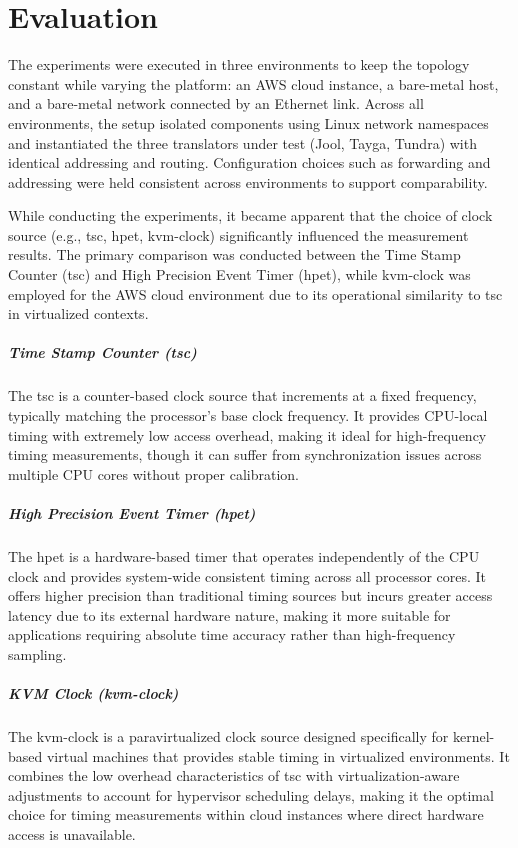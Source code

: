 \chapter{Evaluation}
The experiments were executed in three environments to keep the topology constant while varying the platform: an AWS cloud instance, a bare-metal host, and a bare-metal network connected by an Ethernet link. Across all environments, the setup isolated components using Linux network namespaces and instantiated the three translators under test (Jool, Tayga, Tundra) with identical addressing and routing. Configuration choices such as forwarding and addressing were held consistent across environments to support comparability. 


While conducting the experiments, it became apparent that the choice of clock source (e.g., tsc, hpet, kvm-clock) significantly influenced the measurement results. The primary comparison was conducted between the Time Stamp Counter (tsc) and High Precision Event Timer (hpet), while kvm-clock was employed for the AWS cloud environment due to its operational similarity to tsc in virtualized contexts.

\paragraph{Time Stamp Counter (tsc)} The tsc is a counter-based clock source that increments at a fixed frequency, typically matching the processor's base clock frequency. It provides CPU-local timing with extremely low access overhead, making it ideal for high-frequency timing measurements, though it can suffer from synchronization issues across multiple CPU cores without proper calibration.
\paragraph{High Precision Event Timer (hpet)} The hpet is a hardware-based timer that operates independently of the CPU clock and provides system-wide consistent timing across all processor cores. It offers higher precision than traditional timing sources but incurs greater access latency due to its external hardware nature, making it more suitable for applications requiring absolute time accuracy rather than high-frequency sampling.
\paragraph{KVM Clock (kvm-clock)} The kvm-clock is a paravirtualized clock source designed specifically for kernel-based virtual machines that provides stable timing in virtualized environments. It combines the low overhead characteristics of tsc with virtualization-aware adjustments to account for hypervisor scheduling delays, making it the optimal choice for timing measurements within cloud instances where direct hardware access is unavailable.


